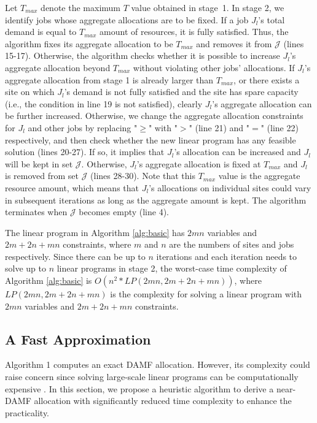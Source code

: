 Let $T_{max}$ denote the maximum $T$ value obtained in stage~1. In stage 2, we identify jobs whose aggregate allocations are to be fixed. If a job $J_l$'s total demand is equal to $T_{max}$ amount of resources, it is fully satisfied. Thus, the algorithm fixes its aggregate allocation to be $T_{max}$ and removes it from $\mathcal{J}$ (lines 15-17). Otherwise, the algorithm checks whether it is possible to increase $J_l$'s aggregate allocation beyond $T_{max}$ without violating other jobs' allocations. If $J_l$'s aggregate allocation from stage 1 is already larger than $T_{max}$, or there exists a site on which $J_l$'s demand is not fully satisfied and the site has spare capacity (i.e., the condition in line 19 is not satisfied), clearly $J_l$'s aggregate allocation can be further increased. Otherwise, we change the aggregate allocation constraints for $J_l$ and other jobs by replacing "$\geq$" with "$>$" (line 21) and "$=$" (line 22) respectively, and then check whether the new linear program has any feasible solution (lines 20-27). If so, it implies that $J_l$'s allocation can be increased and $J_l$ will be kept in set $\mathcal{J}$. Otherwise, $J_l$'s aggregate allocation is fixed at $T_{max}$ and $J_l$ is removed from set $\mathcal{J}$ (lines 28-30). Note that this $T_{max}$ value is the aggregate resource amount, which means that $J_l$'s allocations on individual sites could vary in subsequent iterations as long as the aggregate amount is kept. The algorithm terminates when $\mathcal{J}$ becomes empty (line 4).

The linear program in Algorithm \ref{alg:basic} has $2mn$ variables and $2m+2n+mn$ constraints, where $m$ and $n$ are the numbers of sites and jobs respectively. Since there can be up to $n$ iterations and each iteration needs to solve up to $n$ linear programs in stage 2, the worst-case time complexity of Algorithm \ref{alg:basic} is $O(n^2*LP(2mn,2m+2n+mn))$, where $LP(2mn,2m+2n+mn)$ is the complexity for solving a linear program with $2mn$ variables and $2m+2n+mn$ constraints. 

\subsection{A Fast Approximation}
Algorithm 1 computes an exact DAMF allocation. However, its complexity could raise concern since solving large-scale linear programs can
be computationally expensive \cite{complexity_lip}. In this section, we propose a heuristic algorithm to derive a near-DAMF allocation with significantly reduced time complexity to enhance the practicality.

